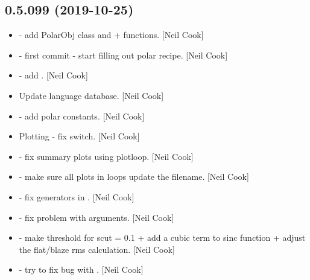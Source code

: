 \documentclass[a4paper,10pt,english]{report}
\begin{document}
\subsection{0.5.099 (2019-10-25)}
\label{\detokenize{misc/changelog:id44}}\begin{itemize}
\item {} 
 - add PolarObj class and 
+  functions. {[}Neil Cook{]}

\item {} 
 - first commit - start filling out
polar recipe. {[}Neil Cook{]}

\item {} 
 - add .
{[}Neil Cook{]}

\item {} 
Update language database. {[}Neil Cook{]}

\item {} 
 - add polar constants. {[}Neil
Cook{]}

\item {} 
Plotting - fix  switch. {[}Neil Cook{]}

\item {} 
 - fix summary plots using plotloop. {[}Neil Cook{]}

\item {} 
 - make sure all plots in loops update the
filename. {[}Neil Cook{]}

\item {} 
 - fix generators in
. {[}Neil Cook{]}

\item {} 
 - fix problem with  arguments. {[}Neil
Cook{]}

\item {} 
 - make threshold for scut = 0.1 + add a cubic term to sinc
function + adjust the flat/blaze rms calculation. {[}Neil Cook{]}

\item {} 
 - try to fix bug with . {[}Neil
Cook{]}


\end{itemize}
\end{document}
